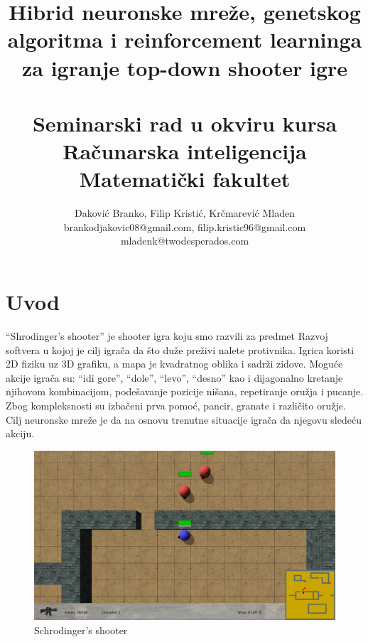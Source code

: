 \documentclass[a4paper]{article}
\begin{document}
\title{Hibrid neuronske mreže, genetskog algoritma i reinforcement learninga za igranje top-down shooter igre\\~\\ \small{Seminarski rad u okviru kursa\\Računarska inteligencija\\ Matematički fakultet}}
\author{Đaković Branko, Filip Kristić, Krčmarević Mladen\\brankodjakovic08@gmail.com, filip.kristic96@gmail.com\\ mladenk@twodesperados.com}

\maketitle

\tableofcontents

\newpage

\section{Uvod}
\label{sec:uvod}
\par “Shrodinger's shooter” je shooter igra koju smo razvili za predmet Razvoj softvera u kojoj je cilj igrača da što duže preživi nalete protivnika. Igrica koristi 2D fiziku uz 3D grafiku, a mapa je kvadratnog oblika i sadrži zidove. Moguće akcije igrača su: “idi gore”, “dole”, “levo”, “desno” kao i dijagonalno kretanje njihovom kombinacijom, podešavanje pozicije nišana, repetiranje oružja i pucanje. Zbog kompleksnosti su izbačeni prva pomoć, pancir, granate i različito oružje. Cilj neuronske mreže\cite{neural} je da na osnovu trenutne situacije igrača da njegovu sledeću akciju. 
\begin{figure}[h!]
	\begin{center}
		\includegraphics[scale=0.18]{igra.png}
	\end{center}
	\caption{Schrodinger's shooter}
	\label{fig:igra}
\end{figure}
  
\end{document}
